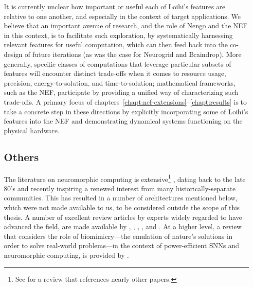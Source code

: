 It is currently unclear how important or useful each of Loihi's features are relative to one another, and especially in the context of target applications.
We believe that an important avenue of research, and the role of Nengo and the NEF in this context, is to facilitate such exploration, by systematically harnessing relevant features for useful computation, which can then feed back into the co-design of future iterations (as was the case for Neurogrid and Braindrop).
More generally, specific classes of computations that leverage particular subsets of features will encounter distinct trade-offs when it comes to resource usage, precision, energy-to-solution, and time-to-solution; mathematical frameworks, such as the NEF, participate by providing a unified way of characterizing such trade-offs.
A primary focus of chapters~\ref{chapt:nef-extensions}--\ref{chapt:results} is to take a concrete step in these directions by explicitly incorporating some of Loihi's features into the NEF and demonstrating dynamical systems functioning on the physical hardware.

\subsection{Others}
\label{sec:neuromorphic-others}

The literature on neuromorphic computing is extensive\footnote{%
See \citet{schuman2017survey} for a review that references nearly  other papers.}%
, dating back to the late 80's and recently inspiring a renewed interest from many historically-separate communities.
This has resulted in a number of architectures mentioned below, which were not made available to us, to be considered outside the scope of this thesis.
A number of excellent review articles by experts widely regarded to have advanced the field, are made available by \citet{bartolozzi1999neuromorphic}, \citet{indiveri2011neuromorphic}, \citet{cassidy2013design}, \citet{cummings2018}, and \citet{rajendran2019low}.
At a higher level, a review that considers the role of biomimicry---the emulation of nature's solutions in order to solve real-world problems---in the context of power-efficient SNNs and neuromorphic computing, is provided by \citet{krichmar2018making}.

